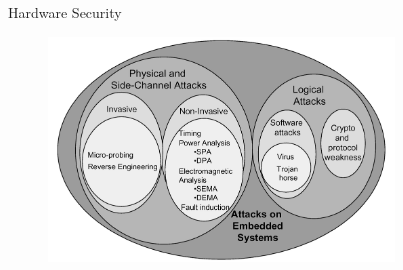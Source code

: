 \documentclass[handout]{beamer}
\begin{document}
\begin{frame}{Hardware Security}

\begin{figure}
\includegraphics[width=260pt]{figures/attacks-on-embedded-systems.png}
\end{figure}

\end{frame}
\end{document}
